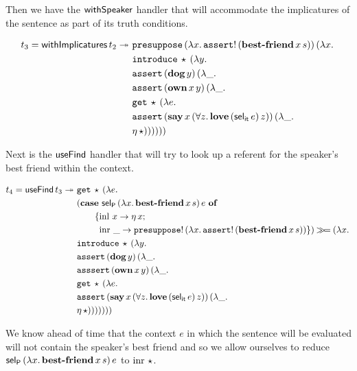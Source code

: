 Then we have the $\mathsf{withSpeaker}$ handler that will accommodate the
implicatures of the sentence as part of its truth conditions.

\begin{align*}
  t_3 = \ap{\withImplicatures}{t_2} \tto \ 
  &\app{\op{presuppose}}{(\lam{x}{\ap{\op{assert}!}{(\app{\obj{best-friend}}{x}{s})}})}{(\lam{x}{ \\
  &\app{\op{introduce}}{\star}{(\lam{y}{ \\
  &\app{\op{assert}}{(\ap{\obj{dog}}{y})}{(\lam{\_}{ \\
  &\app{\op{assert}}{(\app{\obj{own}}{x}{y})}{(\lam{\_}{ \\
  &\app{\op{get}}{\star}{(\lam{e}{ \\
  &\app{\op{assert}}{(\app{\obj{say}}{x}{(\forall z.\, \app{\obj{love}}{(\ap{\selit}{e})}{z})})}{(\lam{\_}{ \\
  &\etaE{\star}})}})}})}})}})}})}
\end{align*}

Next is the $\mathsf{useFind}$ handler that will try to look up a referent for the
speaker's best friend within the context.

\begin{align*}
  t_4 = \mathsf{useFind}\,t_3 \twoheadrightarrow \
  &\mathtt{get}\,\star\,(\lambda e.\,  \\
  &(\text{\textbf{case} $\mathsf{sel}_{\mathsf{P}}\,(\lambda x.\, \textbf{best-friend}\,x\,s)\,e$ \textbf{of}} \\ &\qquad \{\operatorname{inl}\,x \to \eta\,x; \\ &\qquad \ \operatorname{inr}\,\_ \to \mathtt{presuppose}!\,(\lambda x.\, \mathtt{assert}!\,(\textbf{best-friend}\,x\,s)) \}) \mathbin{\gg\!=} (\lambda x.\,  \\
  &\mathtt{introduce}\,\star\,(\lambda y.\,  \\
  &\mathtt{assert}\,(\textbf{dog}\,y)\,(\lambda \_.\,  \\
  &\mathtt{asssert}\,(\textbf{own}\,x\,y)\,(\lambda \_.\,  \\
  &\mathtt{get}\,\star\,(\lambda e.\,  \\
  &\mathtt{assert}\,(\textbf{say}\,x\,(\forall z.\, \textbf{love}\,(\mathsf{sel}_{\mathsf{it}}\,e)\,z))\,(\lambda \_.\,  \\
  &\eta\,\star)))))))
\end{align*}

We know ahead of time that the context $e$ in which the sentence will be
evaluated will not contain the speaker's best friend and so we allow
ourselves to reduce
$\mathsf{sel}_{\mathsf{P}}\,(\lambda x.\, \textbf{best-friend}\,x\,s)\,e$ to
$\operatorname{inr}\,\star$.

